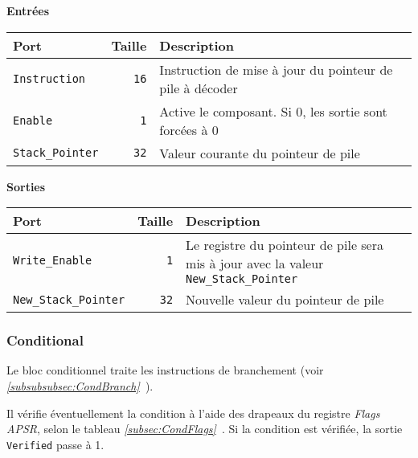 \documentclass{article}
\begin{document}
    \textbf{Entrées}\\

    \begin{tabular}{|l|r|l|}
        \hline
        \textbf{Port}          & \textbf{Taille} & \textbf{Description}                                     \\
        \hline

        \texttt{Instruction}    & \texttt{16}     & Instruction de mise à jour du pointeur de pile à décoder \\
        \hline
        \texttt{Enable}        & \texttt{1}      & Active le composant.
        Si 0, les sortie sont forcées à 0   \\
        \hline
        \texttt{Stack\_Pointer} & \texttt{32}     & Valeur courante du pointeur de pile                      \\

        \hline
    \end{tabular}

    \vspace{1em}
    \textbf{Sorties}\\

    \begin{tabular}{|l|r|l|}
        \hline
        \textbf{Port}                 & \textbf{Taille} & \textbf{Description}                                                                        \\
        \hline

        \hline
        \texttt{Write\_Enable}      & \texttt{1}      & Le registre du pointeur de pile sera mis à jour avec la valeur \texttt{New\_Stack\_Pointer} \\
        \hline
        \texttt{New\_Stack\_Pointer} & \texttt{32}     & Nouvelle valeur du pointeur de pile                                                         \\

        \hline
    \end{tabular}

    \subsubsection{Conditional}
    \label{sec:Conditional}

    Le bloc conditionnel traite les instructions de branchement (voir \textit{\ref{subsubsubsec:CondBranch}~}).

    Il vérifie éventuellement la condition à l'aide des drapeaux du registre \textit{Flags APSR}, selon le tableau  \textit{\ref{subsec:CondFlags}~}.
    Si la condition est vérifiée, la sortie \texttt{Verified} passe à 1.
\end{document}
